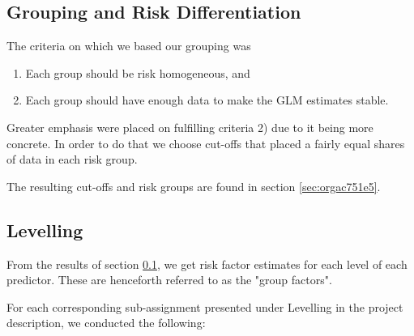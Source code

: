 \documentclass[11pt]{article}
\begin{document}
\subsection{Grouping and Risk Differentiation}
\label{sec:org97e2962}

The criteria on which we based our grouping was

\begin{enumerate}
\item Each group should be risk homogeneous, and
\item Each group should have enough data to make the GLM estimates stable.
\end{enumerate}
Greater emphasis were placed on fulfilling criteria 2) due to it being more concrete. In order to do that
we choose cut-offs that placed a fairly equal shares of data in each risk group. 

The resulting cut-offs and risk groups are found in section \ref{sec:orgac751e5}.

\subsection{Levelling}
\label{sec:org46697c9}

From the results of section \ref{sec:org97e2962}, we get risk factor estimates for each
level of each predictor. These are henceforth referred to as the "group factors".

For each corresponding sub-assignment presented under Levelling in the project description, we conducted the
following:
\end{document}

